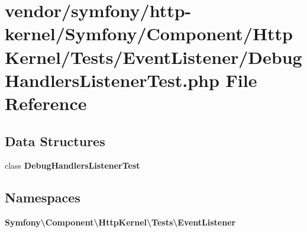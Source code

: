 \section{vendor/symfony/http-\/kernel/\+Symfony/\+Component/\+Http\+Kernel/\+Tests/\+Event\+Listener/\+Debug\+Handlers\+Listener\+Test.php File Reference}
\label{_debug_handlers_listener_test_8php}
\subsection*{Data Structures}
\begin{DoxyCompactItemize}
\item 
class {\bf Debug\+Handlers\+Listener\+Test}
\end{DoxyCompactItemize}
\subsection*{Namespaces}
\begin{DoxyCompactItemize}
\item 
 {\bf Symfony\textbackslash{}\+Component\textbackslash{}\+Http\+Kernel\textbackslash{}\+Tests\textbackslash{}\+Event\+Listener}
\end{DoxyCompactItemize}
